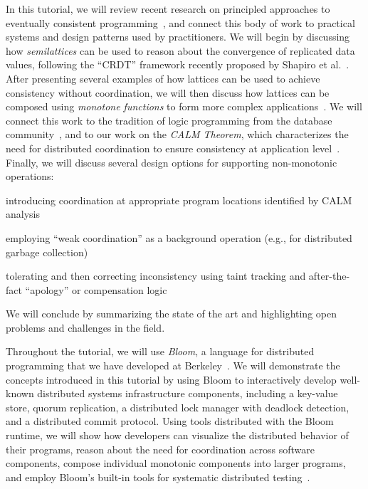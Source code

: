 In this tutorial, we will review recent research on principled approaches to
eventually consistent
programming~\cite{Alvaro2011,Burckhardt2012,Conway2012,Hellerstein2010,Roh2011,Shapiro2011a,Shapiro2011b},
and connect this body of work to practical systems and design patterns used by
practitioners. We will begin by discussing how \emph{semilattices} can be used to
reason about the convergence of replicated data values, following the ``CRDT''
framework recently proposed by Shapiro et
al.~\cite{Shapiro2011a,Shapiro2011b}. After presenting several examples of how
lattices can be used to achieve consistency without coordination, we will then
discuss how lattices can be composed using \emph{monotone functions} to form
more complex applications~\cite{Conway2012}. We will connect this work to the tradition of logic programming from the database community~\cite{AliceBook}, and to our work on the
\emph{CALM Theorem}, which characterizes the need for distributed coordination to 
ensure consistency at application level~\cite{Alvaro2011,Ameloot2011,Hellerstein2010,dedalus-confluence}. Finally,
we will discuss several design options for supporting non-monotonic operations:
\begin{compactenum}[(a)]
\item introducing coordination at appropriate program locations identified by
  CALM analysis
\item employing ``weak coordination'' as a background operation (e.g., for distributed
garbage collection)
\item tolerating and then correcting inconsistency using taint tracking and
after-the-fact ``apology'' or compensation logic~\cite{Garcia-Molina1987,Helland2009,Korth1990}
\end{compactenum}
We will conclude by summarizing the state of the art and highlighting open
problems and challenges in the field.

Throughout the tutorial, we will use \emph{Bloom}, a language for distributed
programming that we have developed at Berkeley~\cite{bloom-website}. We will
demonstrate the concepts introduced in this tutorial by using Bloom to interactively 
develop well-known distributed systems infrastructure components, including a key-value
store, quorum replication, a distributed lock manager with deadlock detection,
and a distributed commit protocol. Using tools distributed with the Bloom
runtime, we will show how developers can visualize the distributed behavior of
their programs, reason about the need for coordination across software components, compose
individual monotonic components into larger programs, and employ Bloom's
built-in tools for systematic distributed testing~\cite{Alvaro2012}.

